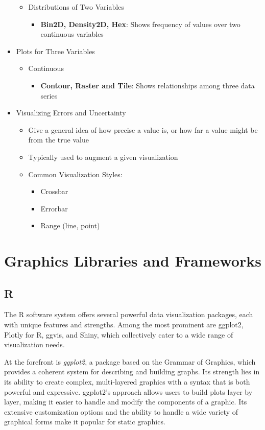 \begin{itemize}
\begin{itemize}
		\item Distributions of Two Variables
			\begin{itemize}
				\item {\bf Bin2D, Density2D, Hex}: Shows frequency of values over two continuous variables
			\end{itemize}
	\end{itemize}
	\item Plots for Three Variables
	\begin{itemize}
		\item Continuous
			\begin{itemize}
				\item {\bf Contour, Raster and Tile}: Shows relationships among three data series
			\end{itemize}
	\end{itemize}
	\item Visualizing Errors and Uncertainty
	\begin{itemize}
		\item Give a general idea of how precise a value is, or how far a value might be from the true value
		\item Typically used to augment a given visualization
		\item Common Visualization Styles:
			\begin{itemize}
			  \item Crossbar
			  \item Errorbar
			  \item Range (line, point)
			\end{itemize}  
	\end{itemize}
\end{itemize}

\section{Graphics Libraries and Frameworks}

\subsection*{R}

The R software system offers several powerful data visualization packages, each with unique features and strengths. Among the most prominent are ggplot2, Plotly for R, ggvis, and Shiny, which collectively cater to a wide range of visualization needs.

At the forefront is \emph{ggplot2}, a package based on the Grammar of Graphics, which provides a coherent system for describing and building graphs. Its strength lies in its ability to create complex, multi-layered graphics with a syntax that is both powerful and expressive. ggplot2's approach allows users to build plots layer by layer, making it easier to handle and modify the components of a graphic. Its extensive customization options and the ability to handle a wide variety of graphical forms make it popular for static graphics.

